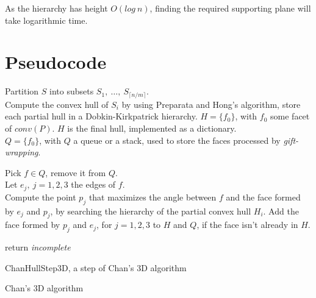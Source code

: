 \documentclass[
12pt,
a4paper,
oneside,
headinclude,
footinclude]{report}
\theoremstyle{definition} %
\begin{document}
As the hierarchy has height $O(log\ n)$, finding the required supporting plane will take logarithmic time.


\section{Pseudocode}

\begin{algorithm}[H]
	\DontPrintSemicolon
	\SetAlgoVlined
	Partition $S$ into subsets $S_1,\ \ldots,\ S_{\lceil n/m \rceil}$.\\
	{
		Compute the convex hull of $S_i$ by using Preparata and Hong's algorithm, store each partial hull in a Dobkin-Kirkpatrick hierarchy.
	}  
	$H = \{f_0\}$, with $f_0$ some facet of $conv(P)$. $H$ is the final hull, implemented as a dictionary.\\
	$Q = \{f_0\}$, with $Q$ a queue or a stack, used to store the faces processed by \textit{gift-wrapping}.
	
	
	{
		{
			Pick $f \in Q$, remove it from $Q$.\\
			Let $e_j,\ j=1,2,3$ the edges of $f$.\\
			{
				Compute the point $p_j$ that maximizes the angle between $f$ and the face formed by $e_j$ and $p_j$, by searching the hierarchy of the partial convex hull $H_i$.
			}
		}
		Add the face formed by $p_j$ and $e_j$, for $j=1,2,3$ to $H$ and $Q$, if the face isn't already in $H$.
	}
	
	return \textit{incomplete}
	\caption{ChanHullStep3D, a step of Chan's 3D algorithm}
\end{algorithm}

\begin{algorithm}[H]
	\DontPrintSemicolon
	\SetAlgoVlined
	\caption{Chan's 3D algorithm}
\end{algorithm}



\end{document}
